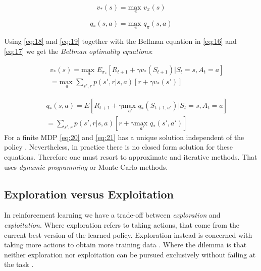 \documentclass{kththesis}
\theoremstyle{definition}
\begin{document}
\begin{equation}
    \label{eq:18}
    v_{*}(s) = \underset{\pi}{\text{max }} v_{\pi}(s)
\end{equation}

\begin{equation}
    \label{eq:19}
    q_{*}(s,a) = \underset{\pi}{\text{max }} q_{\pi}(s,a)
\end{equation}

Using \autoref{eq:18} and \autoref{eq:19} together with the Bellman equation in \autoref{eq:16} and \autoref{eq:17} we get the \textit{Bellman optimality equations}:

\begin{equation}
\label{eq:20}
\begin{aligned}
& & v_{*}(s) =  \underset{a}{\text{max }} 
E_{\pi_{*}}[R_{t+1} + \gamma v_{*}(S_{t+1}) | S_t =s, A_t = a] \\
& & = \underset{a}{\text{max }} 
\sum_{s', r}^{}{p(s', r | s,a)}[r + \gamma v_{*}(s')]
\end{aligned}
\end{equation}

\begin{equation}
\label{eq:21}
\begin{aligned}
& & q_{*}(s,a) = 
E[R_{t+1} + \gamma \underset{a'}{\text{max }}q_{*}(S_{t+1, a'}) | S_t =s, A_t = a] \\
& & =  \sum_{s', r}^{}{p(s', r | s,a)}[r + \gamma \underset{a'}{\text{max }}q_{*}(s',a')]
\end{aligned}
\end{equation}
For a finite MDP \autoref{eq:20} and \autoref{eq:21} has a unique solution independent of the policy \parencite{sutton1998reinforcement}. Nevertheless, in practice there is no closed form solution for these equations. Therefore one must resort to approximate and iterative methods. That uses \textit{dynamic programming} or Monte Carlo methods.

\subsection{Exploration versus Exploitation}
In reinforcement learning we have a trade-off between \textit{exploration} and \textit{exploitation}. Where exploration refers to taking actions, that come from the current best version of the learned policy. Exploration instead is concerned with taking more actions to obtain more training data \parencite{goodfellow2016deep}. Where the dilemma is that neither exploration nor exploitation can be pursued exclusively without failing at the task \parencite{sutton1998reinforcement}.
\end{document}
